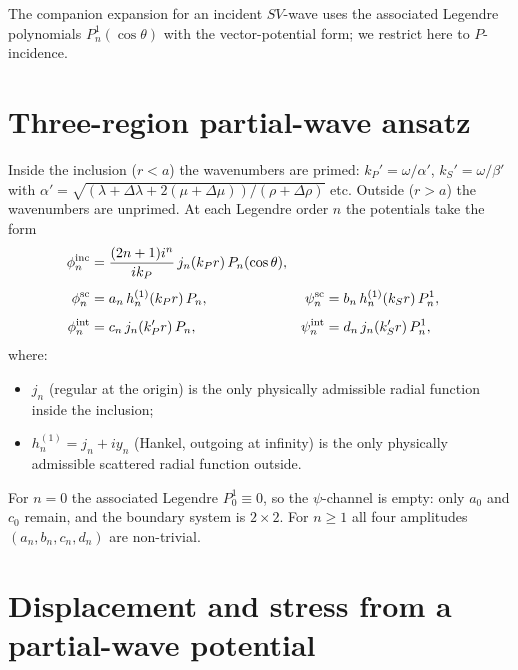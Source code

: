 \documentclass[11pt,a4paper]{article}
\newcommand{\D}{\Delta}
\begin{document}
The companion expansion for an incident $SV$-wave uses the associated
Legendre polynomials $P_n^1(\cos\theta)$ with the vector-potential
form; we restrict here to $P$-incidence.

\section{Three-region partial-wave ansatz}
\label{sec:ansatz}

Inside the inclusion ($r<a$) the wavenumbers are primed:
$k_P'=\omega/\alpha'$, $k_S'=\omega/\beta'$ with
$\alpha'=\sqrt{(\lambda+\D\lambda+2(\mu+\D\mu))/(\rho+\D\rho)}$ etc.
Outside ($r>a$) the wavenumbers are unprimed.  At each Legendre order
$n$ the potentials take the form
\begin{equation}
\begin{aligned}
\phi^{\rm inc}_n &= \frac{(2n+1)i^n}{ik_P}\,j_n(k_P r)\,P_n(\cos\theta), \\[4pt]
\phi^{\rm sc}_n &= a_n\,h_n^{(1)}(k_P r)\,P_n, &
\psi^{\rm sc}_n &= b_n\,h_n^{(1)}(k_S r)\,P_n^1, \\[4pt]
\phi^{\rm int}_n &= c_n\,j_n(k_P' r)\,P_n, &
\psi^{\rm int}_n &= d_n\,j_n(k_S' r)\,P_n^1,
\end{aligned}
\label{eq:ansatz}
\end{equation}
where:
\begin{itemize}[leftmargin=*,nosep]
\item $j_n$ (regular at the origin) is the only physically admissible
radial function inside the inclusion;
\item $h_n^{(1)}=j_n+iy_n$ (Hankel, outgoing at infinity) is the only
physically admissible scattered radial function outside.
\end{itemize}
For $n=0$ the associated Legendre $P_0^1\equiv 0$, so the
$\psi$-channel is empty: only $a_0$ and $c_0$ remain, and the
boundary system is $2\times 2$.  For $n\ge 1$ all four amplitudes
$(a_n,b_n,c_n,d_n)$ are non-trivial.

\section{Displacement and stress from a partial-wave potential}
\label{sec:fields}
\end{document}
